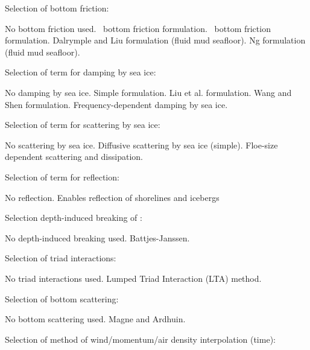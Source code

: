 \noindent
Selection of bottom friction:
\begin{slist}
 {No bottom friction used.}
 {\js\ bottom friction formulation.}
 {\showex\ bottom friction formulation.}
 {Dalrymple and Liu formulation (fluid mud seafloor).}
 {Ng formulation (fluid mud seafloor).}
\end{slist}

\noindent
Selection of term for damping by sea ice:
\begin{slist}
 {No damping by sea ice.}
 {Simple formulation.}
 {Liu et al. formulation.}
 {Wang and Shen formulation.}
 {Frequency-dependent damping by sea ice.}
\end{slist}

\noindent
Selection of term for scattering by sea ice:
\begin{slist}
 {No scattering by sea ice.}
 {Diffusive scattering by sea ice (simple).}
 {Floe-size dependent scattering and dissipation.}
\end{slist}

\noindent
Selection of term for reflection:
\begin{slist}
 {No reflection.}
 {Enables reflection of shorelines and icebergs}
\end{slist}

\noindent
Selection depth-induced breaking of :
\begin{slist}
 {No depth-induced breaking used.}
 {Battjes-Janssen.}
\end{slist}

\noindent
Selection of triad interactions:
\begin{slist}
 {No triad interactions used.}
 {Lumped Triad Interaction (LTA) method.}
\end{slist}

\noindent
Selection of bottom scattering:
\begin{slist}
 {No bottom scattering used.}
 {Magne and Ardhuin.}
\end{slist}

\noindent
Selection of method of wind/momentum/air density interpolation (time):
\begin{slist}
\end{slist}

